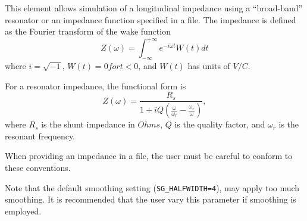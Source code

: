 This element allows simulation of a longitudinal impedance using a
``broad-band'' resonator or an impedance function specified in a file.
The impedance is defined as the Fourier transform of the wake function
\begin{equation}
Z(\omega) = \int_{-\infty}^{+\infty} e^{-i \omega t} W(t) dt
\end{equation}
where $i = \sqrt{-1}$, $W(t)=0 for t<0$, and $W(t)$ has units of $V/C$.

For a resonator impedance, the functional form is
\begin{equation}
Z(\omega) = \frac{R_s}{1 + iQ(\frac{\omega}{\omega_r} - \frac{\omega_r}{\omega})},
\end{equation}
where $R_s$ is the shunt impedance in $Ohms$, $Q$ is the quality
factor, and $\omega_r$ is the resonant frequency.

When providing an impedance in a file, the user must be careful to conform to these
conventions.

Note that the default smoothing setting ({\tt SG\_HALFWIDTH=4}), may apply too much smoothing.
It is recommended that the user vary this parameter if smoothing is employed.

